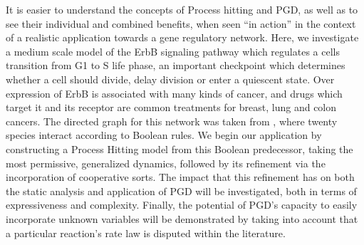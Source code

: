 \documentclass{article}
\begin{document}
It is easier to understand the concepts of Process hitting and PGD, as well as to see their individual and combined benefits, when seen ``in action'' in the context of a realistic application towards a gene regulatory network. Here, we investigate a medium scale model of the ErbB signaling pathway which regulates a cells transition from G1 to S life phase, an important checkpoint which determines whether a cell should divide, delay division or enter a quiescent state. Over expression of ErbB is associated with many kinds of cancer, and drugs which target it and its receptor are common treatments for breast, lung and colon cancers. The directed graph for this network was taken from \cite{Sahin09}, where twenty species interact according to Boolean rules. We begin our application by constructing a Process Hitting model from this Boolean predecessor, taking the most permissive, generalized dynamics, followed by its refinement via the incorporation of cooperative sorts. The impact that this refinement has on both the static analysis and application of PGD will be investigated, both in terms of expressiveness and complexity. Finally, the potential of PGD's capacity to easily incorporate unknown variables will be demonstrated by taking into account that a particular reaction's rate law is disputed within the literature.\\
\end{document}
